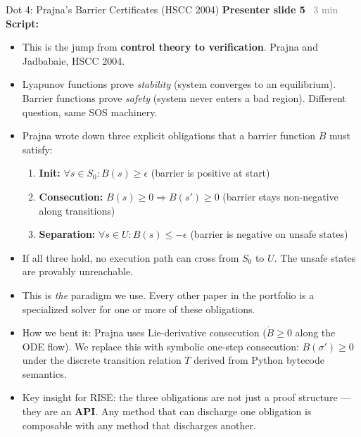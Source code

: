 \documentclass[aspectratio=169]{beamer}
\newcommand{\syncline}[2]{\textbf{#1} \hfill \textcolor{gray}{#2}}
\begin{document}
\begin{frame}{Dot 4: Prajna's Barrier Certificates (HSCC 2004)}
\syncline{Presenter slide 5}{~3 min}
\textbf{Script:}
\begin{itemize}
  \item This is the jump from \textbf{control theory to verification}. Prajna and Jadbabaie, HSCC 2004.
  \item Lyapunov functions prove \emph{stability} (system converges to an equilibrium). Barrier functions prove \emph{safety} (system never enters a bad region). Different question, same SOS machinery.
  \item Prajna wrote down three explicit obligations that a barrier function $B$ must satisfy:
  \begin{enumerate}
    \item \textbf{Init:} $\forall s \in S_0: B(s) \ge \epsilon$ (barrier is positive at start)
    \item \textbf{Consecution:} $B(s) \ge 0 \Rightarrow B(s') \ge 0$ (barrier stays non-negative along transitions)
    \item \textbf{Separation:} $\forall s \in U: B(s) \le -\epsilon$ (barrier is negative on unsafe states)
  \end{enumerate}
  \item If all three hold, no execution path can cross from $S_0$ to $U$. The unsafe states are provably unreachable.
  \item This is \emph{the} paradigm we use. Every other paper in the portfolio is a specialized solver for one or more of these obligations.
  \item How we bent it: Prajna uses Lie-derivative consecution ($\dot{B} \ge 0$ along the ODE flow). We replace this with symbolic one-step consecution: $B(\sigma') \ge 0$ under the discrete transition relation $T$ derived from Python bytecode semantics.
  \item Key insight for RISE: the three obligations are not just a proof structure --- they are an \textbf{API}. Any method that can discharge one obligation is composable with any method that discharges another.
\end{itemize}
\end{frame}

\end{document}
